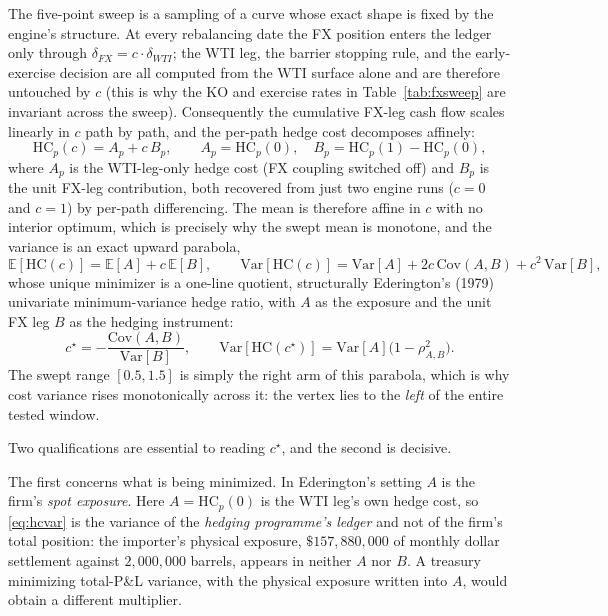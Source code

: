 \documentclass[11pt,a4paper]{article}
\begin{document}
The five-point sweep is a sampling of a curve whose exact shape is fixed by the engine's structure. At every rebalancing date the FX position enters the ledger only through $\delta_{FX}=c\cdot\delta_{WTI}$; the WTI leg, the barrier stopping rule, and the early-exercise decision are all computed from the WTI surface alone and are therefore untouched by $c$ (this is why the KO and exercise rates in Table~\ref{tab:fxsweep} are invariant across the sweep). Consequently the cumulative FX-leg cash flow scales linearly in $c$ path by path, and the per-path hedge cost decomposes affinely:
\begin{equation}
\label{eq:hcaffine}
\mathrm{HC}_p(c) = A_p + c\,B_p, \qquad A_p = \mathrm{HC}_p(0), \quad B_p = \mathrm{HC}_p(1)-\mathrm{HC}_p(0),
\end{equation}
where $A_p$ is the WTI-leg-only hedge cost (FX coupling switched off) and $B_p$ is the unit FX-leg contribution, both recovered from just two engine runs ($c=0$ and $c=1$) by per-path differencing. The mean is therefore affine in $c$ with no interior optimum, which is precisely why the swept mean is monotone, and the variance is an exact upward parabola,
\begin{equation}
\label{eq:hcvar}
\mathbb E[\mathrm{HC}(c)] = \mathbb E[A]+c\,\mathbb E[B], \qquad
\mathrm{Var}[\mathrm{HC}(c)] = \mathrm{Var}[A] + 2c\,\mathrm{Cov}(A,B) + c^2\,\mathrm{Var}[B],
\end{equation}
whose unique minimizer is a one-line quotient, structurally Ederington's (1979) univariate minimum-variance hedge ratio, with $A$ as the exposure and the unit FX leg $B$ as the hedging instrument:
\begin{equation}
\label{eq:cstar}
c^\star = -\frac{\mathrm{Cov}(A,B)}{\mathrm{Var}[B]}, \qquad
\mathrm{Var}[\mathrm{HC}(c^\star)] = \mathrm{Var}[A]\bigl(1-\rho_{A,B}^2\bigr).
\end{equation}
The swept range $[0.5,1.5]$ is simply the right arm of this parabola, which is why cost variance rises monotonically across it: the vertex lies to the \emph{left} of the entire tested window.

Two qualifications are essential to reading $c^\star$, and the second is decisive.

The first concerns what is being minimized. In Ederington's setting $A$ is the firm's \emph{spot exposure}. Here $A=\mathrm{HC}_p(0)$ is the WTI leg's own hedge cost, so \eqref{eq:hcvar} is the variance of the \emph{hedging programme's ledger} and not of the firm's total position: the importer's physical exposure, $\$157{,}880{,}000$ of monthly dollar settlement against $2{,}000{,}000$ barrels, appears in neither $A$ nor $B$. A treasury minimizing total-P\&L variance, with the physical exposure written into $A$, would obtain a different multiplier.
\end{document}
